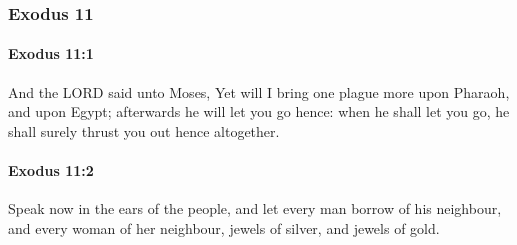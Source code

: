 	\subsubsection{Exodus 11} %
		\label{EXODUS-11}

		\paragraph{Exodus 11:1} %
			\label{EXODUS-11-1}

			And the LORD said unto Moses, Yet will I bring one plague more upon Pharaoh, and upon Egypt; afterwards he will let you go hence: when he shall let you go, he shall surely thrust you out hence altogether.


		\paragraph{Exodus 11:2} %
			\label{EXODUS-11-2}

			Speak now in the ears of the people, and let every man borrow of his neighbour, and every woman of her neighbour, jewels of silver, and jewels of gold.

